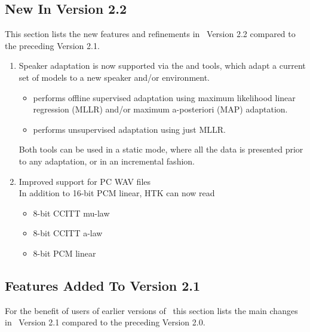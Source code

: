 \subsection{New In Version 2.2}{}

This section lists the new features and refinements in \HTK\ Version
2.2 compared to the preceding Version 2.1.
 
\begin{enumerate}

\item Speaker adaptation is now supported via the  and 
 tools, which adapt a current set of models to a new speaker and/or
environment.
\begin{itemize}

\item {} performs offline supervised adaptation using maximum 
likelihood linear regression (MLLR) and/or maximum a-posteriori (MAP) adaptation.

\item {} performs unsupervised adaptation using just MLLR.

\end{itemize}

Both tools can be used in a static mode, where all the
data is presented prior to any adaptation, or in an incremental fashion.

\item Improved support for PC WAV files\\
In addition to 16-bit PCM linear, HTK can now read  
\begin{itemize}

\item 8-bit CCITT mu-law

\item 8-bit CCITT a-law

\item 8-bit PCM linear

\end{itemize}

\end{enumerate}

\subsection{Features Added To Version 2.1}{}

For the benefit of users of earlier versions of \HTK\, this 
 section lists the main changes 
in \HTK\ Version 2.1 compared to the preceding Version 2.0.

